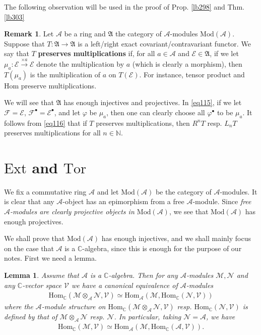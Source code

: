 \documentclass[12pt,b5paper,notitlepage]{report}
\theoremstyle{definition}
\newtheorem{rem}[df]{Remark}
\theoremstyle{plain}
\newtheorem{lm}[df]{Lemma}
\newcommand{\fk}{\mathfrak}
\newcommand{\mc}{\mathcal}
\newcommand{\Hom}{\mathrm{Hom}}
\newcommand{\blt}{\bullet}
\newcommand{\Cbb}{\mathbb C}
\newcommand{\Nbb}{\mathbb N}
\newcommand{\Ext}{\mathrm{Ext}}
\newcommand{\Tor}{\mathrm{Tor}}
\newcommand{\Mod}{\mathrm{Mod}}
\numberwithin{equation}{section}
\begin{document}
The following observation will be used in the proof of Prop. \ref{lb298} and Thm. \ref{lb303}

\begin{rem}\label{lb297}
Let $\mc A$ be a ring and $\fk A$ the category of $\mc A$-modules $\Mod(\mc A)$. Suppose that $T:\fk A\rightarrow\fk A$ is a left/right exact covariant/contravariant functor. We say that $T$ \textbf{preserves multiplications } if, for all $a\in\mc A$ and $\mc E\in\fk A$, if we let $\mu_a:\mc E\xrightarrow{\times a}\mc E$ denote the multiplication by $a$ (which is clearly a morphism), then $T(\mu_a)$ is the multiplication of $a$ on $T(\mc E)$. For instance, tensor product and $\Hom$ preserve multiplications.

We will see that $\fk A$ has enough injectives and projectives. In \eqref{eq115}, if we let $\mc F=\mc E$, $\mc F^\blt=\mc E^\blt$, and let $\varphi$ be $\mu_a$, then one can clearly choose all $\varphi^\blt$ to be $\mu_a$. It follows from \eqref{eq116} that if $T$ preserves multiplications, then $R^n T$ resp. $L_n T$ preserves multiplications for all $n\in\Nbb$.  \hfill\qedsymbol
\end{rem}



\section{$\Ext$ and $\Tor$}


We fix a commutative ring $\mc A$ and let $\Mod(\mc A)$ be the category of $\mc A$-modules. It is clear that any $\mc A$-object has an epimorphism from a free $\mc A$-module. Since \textit{\color{red}free $\mc A$-modules are clearly projective objects in $\Mod(\mc A)$}, we see that $\Mod(\mc A)$ has enough projectives.


We shall prove that $\Mod(\mc A)$ has enough injectives, and we shall mainly focus on the case that $\mc A$ is a $\Cbb$-algebra, since this is enough for the purpose of our notes. First we need a lemma.

\begin{lm}\label{lb255}
Assume that $\mc A$ is a $\Cbb$-algebra. Then for any $\mc A$-modules $\mc M,\mc N$ and any $\Cbb$-vector space $\mc V$ we have a canonical equivalence of $\mc A$-modules
\begin{align}
\Hom_\Cbb(\mc M\otimes_{\mc A}\mc N,\mc V)\simeq \Hom_{\mc A}(\mc M,\Hom_\Cbb(\mc N,\mc V)) \label{eq117}
\end{align}
where the $\mc A$-module structure on $\Hom_\Cbb(\mc M\otimes_{\mc A}\mc N,\mc V)$ resp. $\Hom_\Cbb(\mc N,\mc V)$ is defined by that of $\mc M\otimes_{\mc A}\mc N$ resp. $\mc N$. In particular, taking $\mc N=\mc A$, we have
\begin{align}
\Hom_\Cbb(\mc M,\mc V)\simeq \Hom_{\mc A}(\mc M,\Hom_\Cbb(\mc A,\mc V)).  \label{eq118}
\end{align}
\end{lm}
\end{document}
